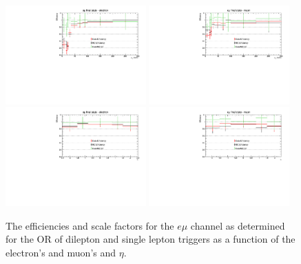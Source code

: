 \begin{figure}[ht]
\centering
\includegraphics[width=0.48\textwidth]{figs/background-estimation/triggerEfficiency/ttbar/muonElectron1_pT_SF.pdf}
\includegraphics[width=0.48\textwidth]{figs/background-estimation/triggerEfficiency/ttbar/muonElectron2_pT_SF.pdf}
\\
\includegraphics[width=0.48\textwidth]{figs/background-estimation/triggerEfficiency/ttbar/muonElectron1_eta_SF.pdf}
\includegraphics[width=0.48\textwidth]{figs/background-estimation/triggerEfficiency/ttbar/muonElectron2_eta_SF.pdf}
\caption{
The efficiencies and scale factors for the $e\mu$ channel as determined for the OR of dilepton and single lepton triggers as a function of the electron's and muon's \pT and $\eta$.
}
\label{fig:App_trigEff_emu}
\end{figure}

